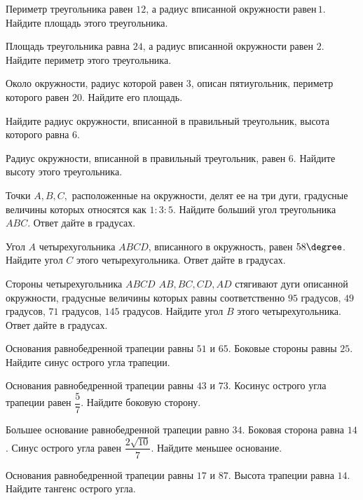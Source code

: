 \begin{consultation}
	\begin{listofex}
		\item Периметр треугольника равен \(12\), а радиус вписанной окружности равен \(1\). Найдите площадь этого треугольника.
		\item Площадь треугольника равна \(24\), а радиус вписанной окружности равен \(2\). Найдите периметр этого треугольника.
		\item Около окружности, радиус которой равен \(3\), описан пятиугольник, периметр которого равен \(20\). Найдите его площадь.
		\item Найдите радиус окружности, вписанной в правильный треугольник, высота которого равна \(6\).
		\item Радиус окружности, вписанной в правильный треугольник, равен \(6\). Найдите высоту этого треугольника.
		\item Точки \(A, B, C,\) расположенные на окружности, делят ее на три дуги, градусные величины которых относятся как \(1 : 3 : 5\). Найдите больший угол треугольника \(ABC\). Ответ дайте в градусах.
		\item Угол \(A\) четырехугольника \(ABCD\), вписанного в окружность, равен \(58\degree\). Найдите угол \(C\) этого четырехугольника. Ответ дайте в градусах.
		\item Стороны четырехугольника \(ABCD \) \( AB, BC, CD, AD\) стягивают дуги описанной окружности, градусные величины которых равны соответственно \(95\) градусов, \(49\) градусов, \(71\) градусов, \(145\) градусов. Найдите угол \(B\) этого четырехугольника. Ответ дайте в градусах.
		\item Основания равнобедренной трапеции равны \(51\) и \(65\). Боковые стороны равны \(25\). Найдите синус острого угла трапеции.
		\item Основания равнобедренной трапеции равны \(43\) и \(73\). Косинус острого угла трапеции равен \( \dfrac{5}{7} \).  Найдите боковую сторону.
		\item Большее основание равнобедренной трапеции равно \(34\). Боковая сторона равна \(14\). Синус острого угла равен \( \dfrac{2\sqrt{10}}{7} \). Найдите меньшее основание.
		\item Основания равнобедренной трапеции равны \(17\) и \(87\). Высота трапеции равна \(14\). Найдите тангенс острого угла.

\end{listofex}
\end{consultation}
